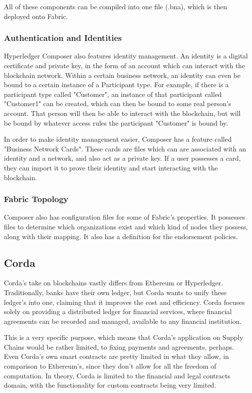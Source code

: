 All of these components can be compiled into one file (.bna), which is then deployed onto Fabric.

\subsubsection{Authentication and Identities}

Hyperledger Composer also features identity management. An identity is a digital certificate and private key, in the form of an account which can interact with the blockchain network. Within a certain business network, an identity can even be bound to a certain instance of a Participant type. For example, if there is a participant type called "Customer", an instance of that participant called "Customer1" can be created, which can then be bound to some real person's account. That person will then be able to interact with the blockchain, but will be bound by whatever access rules the participant "Customer" is bound by. 

In order to make identity management easier, Composer has a feature called "Business Network Cards". These cards are files which can are associated with an identity and a network, and also act as a private key. If a user possesses a card, they can import it to prove their identity and start interacting with the blockchain.

\subsubsection{Fabric Topology}

Composer also has configuration files for some of Fabric's properties. It possesses files to determine which organizations exist and which kind of nodes they possess, along with their mapping. It also has a definition for the endorsement policies.


\subsection{Corda}
Corda's take on blockchains vastly differs from Ethereum or Hyperledger. Traditionally, banks have their own ledger, but Corda wants to unify these ledger's into one, claiming that it improves the cost and efficiency. Corda focuses solely on providing a distributed ledger for financial services, where financial agreements can be recorded and managed, available to any financial institution\cite{Brown2016}. 

This is a very specific purpose, which means that Corda's application on Supply Chains would be rather limited, to fixing payments and agreements, perhaps. Even Corda's own smart contracts are pretty limited in what they allow, in comparison to Ethereum's, since they don't allow for all the freedom of computation. In theory, Corda is limited to the financial and legal contracts domain, with the functionality for custom contracts being very limited.

